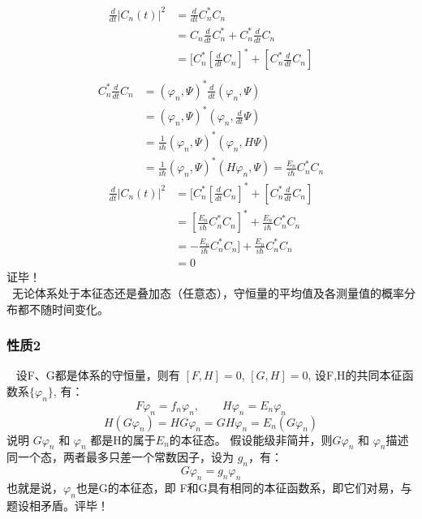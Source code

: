 \begin{frame} [allowframebreaks=]
    $$\begin{aligned}
      \frac{d}{dt} |C_n(t)|^2 &= \frac{d}{dt} C_n^* C_n \\
      &=C_n \frac{d}{dt} C_n^*  +  C_n^*\frac{d}{dt}C_n \\
      &=[C_n^*[\frac{d}{dt} C_n]^*  +  [C_n^*\frac{d}{dt}C_n] \\
    \end{aligned}$$
    $$\begin{aligned}
      C_n^*\frac{d}{dt}C_n&= (\varphi_n, \Psi)^* \frac{d}{dt}(\varphi_n, \Psi) \\
      &= (\varphi_n, \Psi)^* (\varphi_n, \frac{d}{dt}\Psi) \\
      &= \frac{1}{i\hbar}(\varphi_n, \Psi)^* (\varphi_n, H\Psi) \\
      &= \frac{1}{i\hbar}(\varphi_n, \Psi)^* (H\varphi_n, \Psi) = \frac{E_n}{i\hbar}C_n ^* C_n 
    \end{aligned}$$
    $$\begin{aligned}
        \frac{d}{dt} |C_n(t)|^2 &= [C_n^*[\frac{d}{dt} C_n]^*  +  [C_n^*\frac{d}{dt}C_n] \\
        &= [\frac{E_n}{i\hbar}C_n ^* C_n ]^* + \frac{E_n}{i\hbar}C_n ^* C_n \\
        &= -\frac{E_n}{i\hbar}C_n ^* C_n ] + \frac{E_n}{i\hbar}C_n ^* C_n \\
        &=0
    \end{aligned}$$
      证毕！ \\
    \Tips ~无论体系处于本征态还是叠加态（任意态），守恒量的平均值及各测量值的概率分布都不随时间变化。         
\end{frame}

\begin{frame}
    \frametitle{性质2}
    \证~ 设F、G都是体系的守恒量，则有 $[F,H]=0$, $[G,H]=0$, 设F,H的共同本征函数系$\{\varphi_n\}$, 有：\\ 
    $$F\varphi_n =f_n \varphi_n, \qquad H\varphi_n =E_n \varphi_n $$
    $$H(G\varphi_n) =HG\varphi_n=GH\varphi_n= E_n (G\varphi_n)$$
    说明 $G\varphi_n$ 和 $\varphi_n$ 都是H的属于$E_n$的本征态。
    假设能级非简并，则$G\varphi_n$ 和 $\varphi_n$描述同一个态，两者最多只差一个常数因子，设为 $g_n$，有：
    $$G\varphi_n=g_n \varphi_n$$
    也就是说，$\varphi_n$也是G的本征态，即 F和G具有相同的本征函数系，即它们对易，与题设相矛盾。评毕！\\
\end{frame}

